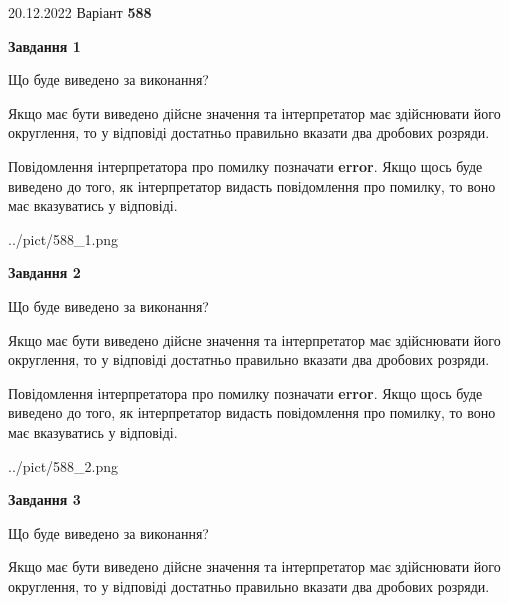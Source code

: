 \documentclass[12pt, ukrainian]{article}
\begin{document}
{20.12.2022 Варіант \No \textbf { 588 }\par}
{
\begin {Large}

{\begin {center}\textbf{Завдання 1}\end {center}}\par
Що буде виведено за виконання? \par

Якщо має бути виведено дійсне значення та інтерпретатор має здійснювати його округлення, 
то у відповіді достатньо правильно вказати два дробових розряди.

Повідомлення інтерпретатора про помилку позначати \textbf{error}.
Якщо щось буде виведено до того, як інтерпретатор видасть повідомлення про помилку, 
то воно має вказуватись у відповіді. \par

\begin{center}
	{../pict/588_1.png}
\end{center}
\newpage

{\begin {center}\textbf{Завдання 2}\end {center}}\par
Що буде виведено за виконання? \par

Якщо має бути виведено дійсне значення та інтерпретатор має здійснювати його округлення, 
то у відповіді достатньо правильно вказати два дробових розряди.

Повідомлення інтерпретатора про помилку позначати \textbf{error}.
Якщо щось буде виведено до того, як інтерпретатор видасть повідомлення про помилку, 
то воно має вказуватись у відповіді. \par

\begin{center}
	{../pict/588_2.png}
\end{center}
\newpage

{\begin {center}\textbf{Завдання 3}\end {center}}\par
Що буде виведено за виконання? \par

Якщо має бути виведено дійсне значення та інтерпретатор має здійснювати його округлення, 
то у відповіді достатньо правильно вказати два дробових розряди.


\end{Large}}
\end{document}
